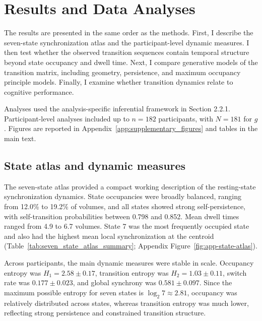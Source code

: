 \documentclass[12pt,a4paper]{report}
\begin{document}
\chapter{Results and Data Analyses}

The results are presented in the same order as the methods. First, I describe the seven-state synchronization atlas and the participant-level dynamic measures. I then test whether the observed transition sequences contain temporal structure beyond state occupancy and dwell time. Next, I compare generative models of the transition matrix, including geometry, persistence, and maximum occupancy principle models. Finally, I examine whether transition dynamics relate to cognitive performance.

Analyses used the analysis-specific inferential framework in Section 2.2.1. Participant-level analyses included up to $n=182$ participants, with $N=181$ for $g$. Figures are reported in Appendix~\ref{app:supplementary_figures} and tables in the main text.

\section{State atlas and dynamic measures}

The seven-state atlas provided a compact working description of the resting-state synchronization dynamics. State occupancies were broadly balanced, ranging from 12.0\% to 19.2\% of volumes, and all states showed strong self-persistence, with self-transition probabilities between 0.798 and 0.852. Mean dwell times ranged from 4.9 to 6.7 volumes. State 7 was the most frequently occupied state and also had the highest mean local synchronization at the centroid (Table~\ref{tab:seven_state_atlas_summary}; Appendix Figure~\ref{fig:app-state-atlas}).

Across participants, the main dynamic measures were stable in scale. Occupancy entropy was $H_1 = 2.58 \pm 0.17$, transition entropy was $H_2 = 1.03 \pm 0.11$, switch rate was $0.177 \pm 0.023$, and global synchrony was $0.581 \pm 0.097$. Since the maximum possible entropy for seven states is $\log_2 7 \approx 2.81$, occupancy was relatively distributed across states, whereas transition entropy was much lower, reflecting strong persistence and constrained transition structure.
\end{document}
